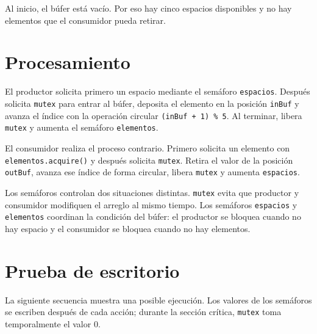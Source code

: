 \documentclass[12pt,oneside]{template/liverpoolthesis}
\begin{document}
Al inicio, el búfer está vacío. Por eso hay cinco espacios disponibles y no
hay elementos que el consumidor pueda retirar.

\section{Procesamiento}

El productor solicita primero un espacio mediante el semáforo
\texttt{espacios}. Después solicita \texttt{mutex} para entrar al búfer, deposita el elemento en
la posición \texttt{inBuf} y avanza el índice con la operación circular
\texttt{(inBuf + 1) \% 5}. Al terminar, libera \texttt{mutex} y aumenta el
semáforo \texttt{elementos}.

El consumidor realiza el proceso contrario. Primero solicita un elemento con
\texttt{elementos.acquire()} y después solicita \texttt{mutex}. Retira el
valor de la posición \texttt{outBuf}, avanza ese índice de forma circular,
libera \texttt{mutex} y aumenta \texttt{espacios}.

Los semáforos controlan dos situaciones distintas. \texttt{mutex} evita que
productor y consumidor modifiquen el arreglo al mismo tiempo. Los semáforos
\texttt{espacios} y \texttt{elementos} coordinan la condición del búfer: el
productor se bloquea cuando no hay espacio y el consumidor se bloquea cuando
no hay elementos.

\section{Prueba de escritorio}

La siguiente secuencia muestra una posible ejecución. Los valores de los
semáforos se escriben después de cada acción; durante la sección crítica,
\texttt{mutex} toma temporalmente el valor 0.
\end{document}
